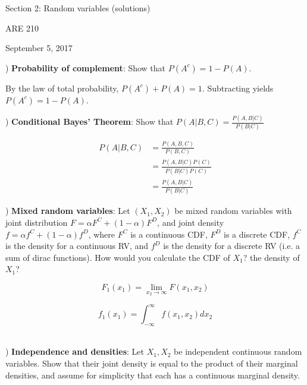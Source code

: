 \documentclass[12pt,english]{article}
\begin{document}
\begin{center}
{\Large{}Section 2: Random variables (solutions)}
\par\end{center}{\Large \par}

\begin{center}
ARE 210
\par\end{center}

\begin{center}
September 5, 2017
\par\end{center}

) \textbf{Probability of complement}: Show that $P(A^{c}) = 1 - P(A)$.
\vspace{1em}

By the law of total probability, $P(A^{c}) + P(A) = 1$. Subtracting yields $P(A^{c}) = 1 - P(A)$.

\vspace{1em}
) \textbf{Conditional Bayes' Theorem}: Show that $P(A | B, C) = \frac{P(A, B | C)}{P(B | C)}$
\vspace{1em}

\begin{align*}
P(A | B, C) & = \frac{P(A, B, C)}{P(B, C)} \\
& = \frac{P(A, B | C) P(C)}{P(B | C) P(C)} \\
& = \frac{P(A, B |C)}{P(B | C)}
\end{align*}

\vspace{1em}
) \textbf{Mixed random variables}: Let $(X_{1}, X_{2})$ be mixed random variables with joint distribution $F = \alpha F^{C} + (1 - \alpha) F^{D}$, and joint density $f = \alpha f^{C} + (1 - \alpha) f^{D}$, where $F^{C}$ is a continuous CDF, $F^{D}$ is a discrete CDF, $f^{C}$ is the density for a continuous RV, and $f^{D}$ is the density for a discrete RV (i.e. a sum of dirac functions). How would you calculate the CDF of $X_{1}$? the density of $X_{1}$?
\vspace{1em}

$$ F_{1}(x_{1}) = \lim_{x_{2} \to \infty} F(x_{1}, x_{2}) $$

$$ f_{1}(x_{1}) = \int_{-\infty}^{\infty} f(x_{1}, x_{2}) dx_{2} $$\

\vspace{1em}
) \textbf{Independence and densities}: Let $X_{1}, X_{2}$ be independent continuous random variables. Show that their joint density is equal to the product of their marginal densities, and assume for simplicity that each has a continuous marginal density.
\end{document}
